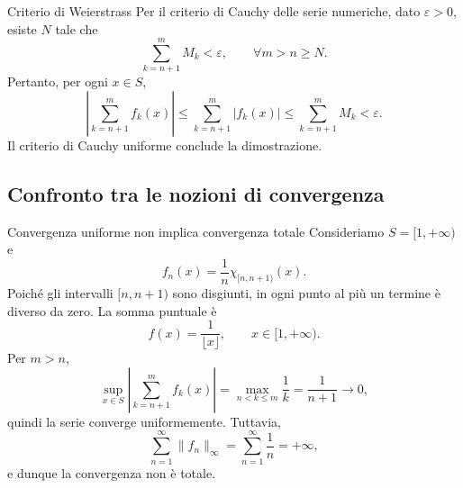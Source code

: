\documentclass[a4paper]{article}
\begin{document}
\begin{radioactive}
\begin{snippetproof}{Criterio di Weierstrass}
    Per il criterio di Cauchy delle serie numeriche, dato \(\varepsilon>0\), esiste
    \(N\) tale che
    \[
        \sum_{k=n+1}^{m}M_k<\varepsilon,
        \qquad \forall m>n\geq N.
    \]
    Pertanto, per ogni \(x\in S\),
    \[
        \left|\sum_{k=n+1}^{m}f_k(x)\right|
        \leq\sum_{k=n+1}^{m}|f_k(x)|
        \leq\sum_{k=n+1}^{m}M_k<\varepsilon.
    \]
    Il criterio di Cauchy uniforme conclude la dimostrazione.
\end{snippetproof}
\end{radioactive}

\subsection{Confronto tra le nozioni di convergenza}

\begin{radioactive}
\begin{center}
\end{center}
\end{radioactive}

\begin{radioactive}
\begin{snippetexample}{Convergenza uniforme non implica convergenza totale}
    Consideriamo \(S=[1,+\infty)\) e
    \[
        f_n(x)=\frac1n\chi_{[n,n+1)}(x).
    \]
    Poiché gli intervalli \([n,n+1)\) sono disgiunti, in ogni punto al più un termine
    è diverso da zero. La somma puntuale è
    \[
        f(x)=\frac1{\lfloor x\rfloor},
        \qquad x\in[1,+\infty).
    \]
    Per \(m>n\),
    \[
        \sup_{x\in S}\left|\sum_{k=n+1}^{m}f_k(x)\right|
        =\max_{n<k\leq m}\frac1k
        =\frac1{n+1}\longrightarrow0,
    \]
    quindi la serie converge uniformemente. Tuttavia,
    \[
        \sum_{n=1}^\infty\lVert f_n\rVert_\infty
        =\sum_{n=1}^\infty\frac1n=+\infty,
    \]
    e dunque la convergenza non è totale.
\end{snippetexample}
\end{radioactive}
\end{document}
